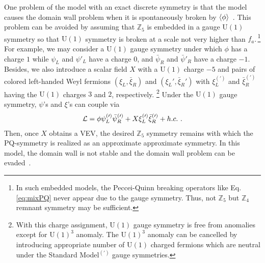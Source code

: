\documentclass[aps,amsmath,preprint,epsf,superscriptaddress,nofootinbib,notitlepage]{revtex4-1}
\begin{document}
One problem of the model with an exact discrete symmetry is that the model causes the domain wall problem
when it is spontaneously broken by $\left\langle {\phi} \right\rangle$~\cite{Zeldovich:1974uw,Kibble:1976sj}.
This problem can be avoided by assuming that ${\mathbb Z}_5$ is embedded in a gauge $\text{U}(1)$ symmetry
so that $\text{U}(1)$ symmetry is broken at a scale not very higher than $f_a$.\,\footnote{In such embedded models, the Peccei-Quinn breaking operators like Eq.\,\ref{eq:mixPQ} never appear due to the gauge symmetry. Thus, not $\mathbb{Z}_5$ but $\mathbb{Z}_4$ remnant symmetry may be sufficient.}
For example, we may consider a $\text{U}(1)$ gauge symmetry under which 
$\phi$ has a charge $1$ while $\psi_L$ and $\psi'_L$ have a charge $0$, and $\bar \psi_R$ and $\bar\psi'_R$
have a charge $-1$.
Besides, we also introduce a scalar field $X$ with a $\text{U}(1)$ charge $-5$ and pairs of colored left-handed Weyl fermions 
$(\xi_L,\bar\xi_R)$ and $(\xi_L',\bar\xi_R')$ with $\xi^{(')}_L$ and 
$\bar\xi_R^{(')}$ having the $\text{U}(1)$ charges $3$ and $2$, respectively.%
\footnote{With this charge assignment, $\text{U}(1)$ gauge symmetry is free from anomalies except for $\text{U}(1)^3$ anomaly.
The $\text{U}(1)^3$ anomaly can be cancelled by introducing appropriate number of $\text{U}(1)$ charged fermions 
which are neutral under the Standard Model$^{(\prime)}$  gauge symmetries.}
Under the $\text{U}(1)$ gauge symmetry, $\psi$'s and $\xi$'s can couple via
\begin{eqnarray}
{\cal L} = \phi \psi_L^{(\prime)}\bar\psi_R^{(\prime)}
+ X \xi_L^{(\prime)}\bar\xi_R^{(\prime)} + h.c. \  .
\end{eqnarray}
Then, once $X$ obtains a VEV, the desired ${\mathbb Z}_5$ symmetry remains with which 
the PQ-symmetry is realized as an approximate approximate symmetry.
In this model, the domain wall is not stable and the domain wall problem can be evaded~\cite{InPrep}.










 



%
\end{document}
